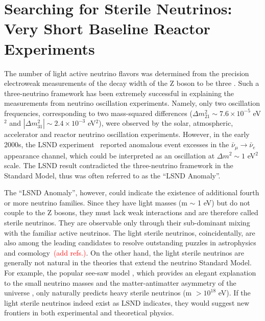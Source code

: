 \section{Searching for Sterile Neutrinos: Very Short Baseline Reactor Experiments}

The number of light active neutrino flavors was determined from the precision electroweak measurements of the decay width of the Z boson to be three \cite{EW-2005}. 
Such a three-neutrino framework has been extremely successful in explaining the measurements from neutrino oscillation experiments. 
Namely, only two oscillation frequencies, corresponding to two mass-squared differences ($\Delta m_{21}^2\sim7.6\times10^{-5}$ eV$^2$ and $|\Delta m_{31}^2|\sim2.4\times10^{-3}$ eV$^2$), were observed by the solar, atmospheric, accelerator and reactor neutrino oscillation experiments. 
However, in the early 2000s, the LSND experiment~\cite{LSND2001} reported anomalous event excesses in the $\bar\nu_\mu\rightarrow\bar\nu_e$ appearance channel, which could be interpreted as an oscillation at $\Delta m^2\sim1$ eV$^2$ scale. 
The LSND result contradicted the three-neutrino framework in the Standard Model, thus was often referred to as the ``LSND Anomaly''.

The ``LSND Anomaly'', however, could indicate the existence of additional
fourth or more neutrino families. 
Since they have light masses (m $\sim$ 1 eV) but do not couple to the Z bosons, they must lack weak interactions and are therefore called sterile neutrinos. 
They are observable only through their sub-dominant mixing with the familiar active neutrinos. 
The light sterile neutrinos, coincidentally, are also among the leading candidates to resolve outstanding puzzles in astrophysics and cosmology~\textcolor{red}{(add refs.)}.
On the other hand, the light sterile neutrinos are generally not natural in the theories that extend the neutrino Standard Model. 
For example, the popular see-saw model \cite{SeeSaw}, which provides an elegant explanation to the small neutrino masses and the matter-antimatter asymmetry of the universe \cite{leptogenesis}, only naturally predicts heavy sterile neutrinos (m $>10^{18}$ eV).
If the light sterile neutrinos indeed exist as LSND indicates, they would suggest new frontiers in both experimental and theoretical physics.

